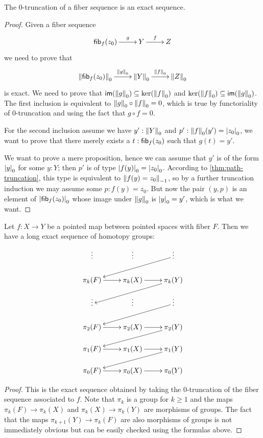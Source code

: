 \begin{lem}
  The $0$-truncation of a fiber sequence is an exact sequence.
\end{lem}
\begin{proof}
  Given a fiber sequence
  \[\xymatrix{\hfib{f}{z_0} \ar^-g[r] & Y \ar^-f[r] & Z}\]
  we need to prove that
  \[\xymatrix{\trunc{0}{\hfib{f}{z_0}} \ar^-{\trunc0g}[r] & \trunc0{Y}
    \ar^-{\trunc0{f}}[r] & \trunc0{Z}}\]
  is exact.
  We need to prove that $\im(\trunc0g)\subseteq\ker(\trunc0f)$ and
  $\ker(\trunc0f)\subseteq\im(\trunc0g)$.
  The first inclusion is equivalent to $\trunc0g\circ\trunc0f=0$, which is true
  by functoriality of 0-truncation and using the fact that $g\circ f=0$.

  For the second inclusion assume we have $y':\trunc0Y$ and
  $p':\trunc0f(y')=\tproj0{z_0}$, we want to prove that there merely exists a
  $t:\hfib{f}{z_0}$ such that $g(t)=y'$.

  We want to prove a mere proposition, hence we can assume that $y'$ is of the
  form $\tproj0y$ for some $y:Y$; then $p'$ is of type
  $\tproj0{f(y)}=\tproj0{z_0}$. According to \autoref{thm:path-truncation}, this
  type is equivalent to $\trunc{-1}{f(y)=z_0}$, so by a further truncation induction we may assume
  some $p:f(y)=z_0$. But now the pair $(y,p)$ is
  an element of $\tproj0{\hfib{f}{z_0}}$ whose image under $\trunc0g$ is
  $\tproj0y=y'$, which is what we want.
\end{proof}

\vspace*{0pt plus 10ex}
\goodbreak

\begin{thm}\label{thm:les}
  Let $f:X \to Y$ be a pointed map between pointed spaces with fiber $F$. Then
  we have a long exact sequence of homotopy groups:
  \[
  \xymatrix@R=1.2pc{
    \vdots & \vdots & \vdots \ar[lld] \\
    \pi_k(F) \ar[r] & \pi_k(X) \ar[r] & \pi_k(Y) \ar[lld] \\
    \vdots & \vdots & \vdots \ar[lld] \\
    \pi_2(F) \ar[r] & \pi_2(X) \ar[r] & \pi_2(Y) \ar[lld] \\
    \pi_1(F) \ar[r] & \pi_1(X) \ar[r] & \pi_1(Y) \ar[lld]\\
    \pi_0(F) \ar[r] & \pi_0(X) \ar[r] & \pi_0(Y)}
  \]
\end{thm}
\begin{proof}
  This is the exact sequence obtained by taking the $0$-truncation of the fiber
  sequence associated to $f$. Note that $\pi_k$ is a group for $k\ge1$ and the
  maps $\pi_k(F)\to\pi_k(X)$ and $\pi_k(X)\to\pi_k(Y)$ are morphisms of groups.
  The fact that the maps $\pi_{k+1}(Y)\to\pi_k(F)$ are also morphisms of groups
  is not immediately obvious but can be easily checked using the formulas above.
\end{proof}

